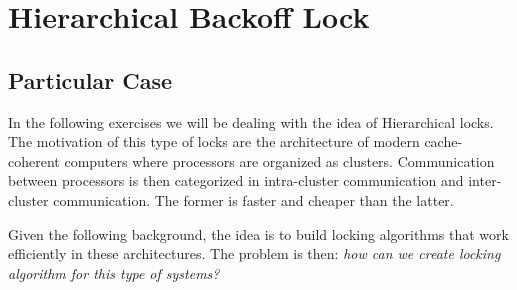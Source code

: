 \section{\textbf{Hierarchical Backoff Lock}}
\subsection{Particular Case}
\par
In the following exercises we will be dealing with the idea of Hierarchical
locks. The motivation of this type of locks are the architecture of modern
cache-coherent computers where processors are organized as clusters.
Communication between processors is then categorized in intra-cluster
communication and inter-cluster communication. The former is faster and cheaper
than the latter. 
\par
Given the following background, the idea is  to build locking algorithms that
work efficiently in these architectures. The problem is then: \textit{how can we
create locking algorithm for this type of systems?}
\par
